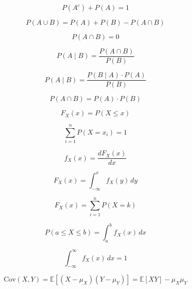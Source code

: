 \documentclass[12pt]{report}
\begin{document}
\begin{equation}
P(A^c) + P(A) = 1
\end{equation}

\begin{equation}
P(A \cup B) = P(A) + P(B) - P(A \cap B)
\end{equation}

\begin{equation}
P(A \cap B) = 0
\end{equation}

\begin{equation}
P(A \mid B) = \frac{P(A \cap B)}{P(B)}
\end{equation}

\begin{equation}
P(A \mid B) = \frac{P(B \mid A) \cdot P(A)}{P(B)}
\end{equation}

\begin{equation}
P(A \cap B) = P(A) \cdot P(B)
\end{equation}

\begin{equation}
F_X(x) = P(X \leq x)
\end{equation}

\begin{equation}
\sum_{i=1}^{n} P(X = x_i) = 1
\end{equation}

\begin{equation}
f_X(x) = \frac{dF_X(x)}{dx}
\end{equation}

\begin{equation}
F_X(x) = \int_{-\infty}^{x} f_X(y) \, dy
\end{equation}

\begin{equation}
F_X(x) = \sum_{i=1}^{n} P(X = k)
\end{equation}

\begin{equation}
P(a \leq X \leq b) = \int_{a}^{b} f_X(x) \, dx
\end{equation}

\begin{equation}
\int_{-\infty}^{\infty} f_X(x) \, dx = 1
\end{equation}

\begin{equation}
\text{Cov}(X, Y) = \mathbb{E}[(X - \mu_X)(Y - \mu_Y)] = \mathbb{E}[XY] - \mu_X \mu_Y
\end{equation}
\end{document}
